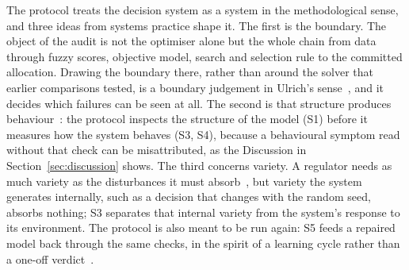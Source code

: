 \documentclass[systems,article,accept,moreauthors,pdftex]{Definitions/mdpi}
\begin{document}
The protocol treats the decision system as a system in the methodological sense, and three
ideas from systems practice shape it. The first is the boundary. The object of the audit is
not the optimiser alone but the whole chain from data through fuzzy scores, objective model,
search and selection rule to the committed allocation. Drawing the boundary there, rather
than around the solver that earlier comparisons tested, is a boundary judgement in Ulrich's
sense~\cite{ulrich1987critical}, and it decides which failures can be seen at all. The second
is that structure produces behaviour~\cite{sterman2002allmodels}: the protocol inspects the
structure of the model (S1) before it measures how the system behaves (S3, S4), because a
behavioural symptom read without that check can be misattributed, as the
Discussion in Section~\ref{sec:discussion} shows. The third concerns variety. A regulator needs as much variety
as the disturbances it must absorb~\cite{ashby1956cybernetics}, but variety the system
generates internally, such as a decision that changes with the random seed, absorbs nothing;
S3 separates that internal variety from the system's response to its environment. The
protocol is also meant to be run again: S5 feeds a repaired model back through the same
checks, in the spirit of a learning cycle rather than a one-off verdict~\cite{checkland2000ssm}.
\end{document}
